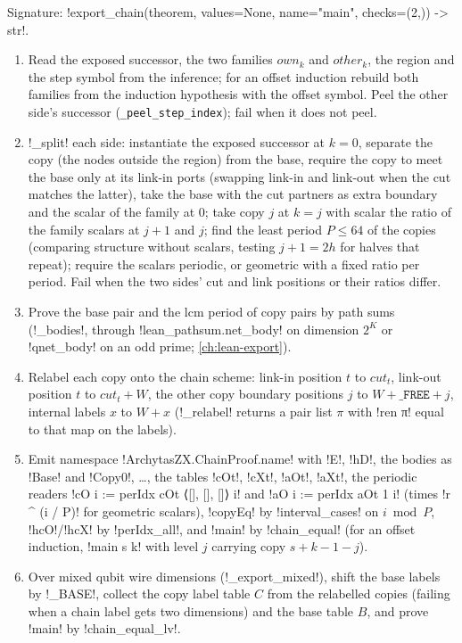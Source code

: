 {\begin{algorithm}\label{alg:boxes-export-chain}
Signature: \py!export_chain(theorem, values=None, name="main", checks=(2,)) -> str!.
\begin{enumerate}
\item Read the exposed successor, the two families $\mathit{own}_k$ and $\mathit{other}_k$, the region and the step symbol from the inference; for an offset induction rebuild both families from the induction hypothesis with the offset symbol. Peel the other side's successor (\texttt{\_peel\_step\_index}); fail when it does not peel.
\item \py!_split! each side: instantiate the exposed successor at $k=0$, separate the copy (the nodes outside the region) from the base, require the copy to meet the base only at its link-in ports (swapping link-in and link-out when the cut matches the latter), take the base with the cut partners as extra boundary and the scalar of the family at $0$; take copy $j$ at $k=j$ with scalar the ratio of the family scalars at $j+1$ and $j$; find the least period $P\le64$ of the copies (comparing structure without scalars, testing $j+1=2h$ for halves that repeat); require the scalars periodic, or geometric with a fixed ratio per period. Fail when the two sides' cut and link positions or their ratios differ.
\item Prove the base pair and the $\mathrm{lcm}$ period of copy pairs by path sums (\py!_bodies!, through \py!lean_pathsum.net_body! on dimension $2^K$ or \py!qnet_body! on an odd prime; \cref{ch:lean-export}).
\item Relabel each copy onto the chain scheme: link-in position $t$ to $\mathit{cut}_t$, link-out position $t$ to $\mathit{cut}_t+W$, the other copy boundary positions $j$ to $W+\mathtt{\_FREE}+j$, internal labels $x$ to $W+x$ (\py!_relabel! returns a pair list $\pi$ with \lbx!ren π! equal to that map on the labels).
\item Emit namespace \lbx!ArchytasZX.ChainProof.name! with \lbx!E!, \lbx!hD!, the bodies as \lbx!Base! and \lbx!Copy0!, \ldots, the tables \lbx!cOt!, \lbx!cXt!, \lbx!aOt!, \lbx!aXt!, the periodic readers \lbx!cO i := perIdx cOt ⟨[], [], []⟩ i! and \lbx!aO i := perIdx aOt 1 i! (times \lbx!r ^ (i / P)! for geometric scalars), \lbx!copyEq! by \lbx!interval_cases! on $i\bmod P$, \lbx!hcO!/\lbx!hcX! by \lbx!perIdx_all!, and \lbx!main! by \lbx!chain_equal! (for an offset induction, \lbx!main s k! with level $j$ carrying copy $s+k-1-j$).
\item Over mixed qubit wire dimensions (\py!_export_mixed!), shift the base labels by \py!_BASE!, collect the copy label table $C$ from the relabelled copies (failing when a chain label gets two dimensions) and the base table $B$, and prove \lbx!main! by \lbx!chain_equal_lv!.

\end{enumerate}
\end{algorithm}}
